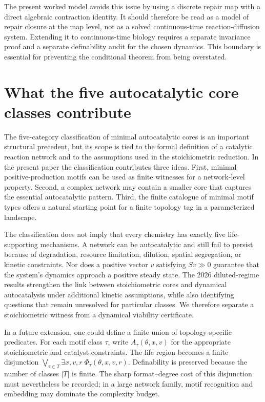 \documentclass[11pt,a4paper]{article}
\theoremstyle{definition}
\theoremstyle{remark}
\begin{document}
The present worked model avoids this issue by using a discrete repair map with a direct algebraic contraction identity. It should therefore be read as a model of repair closure at the map level, not as a solved continuous-time reaction-diffusion system. Extending it to continuous-time biology requires a separate invariance proof and a separate definability audit for the chosen dynamics. This boundary is essential for preventing the conditional theorem from being overstated.

\section{What the five autocatalytic core classes contribute}
The five-category classification of minimal autocatalytic cores is an important structural precedent, but its scope is tied to the formal definition of a catalytic reaction network and to the assumptions used in the stoichiometric reduction. In the present paper the classification contributes three ideas. First, minimal positive-production motifs can be used as finite witnesses for a network-level property. Second, a complex network may contain a smaller core that captures the essential autocatalytic pattern. Third, the finite catalogue of minimal motif types offers a natural starting point for a finite topology tag in a parameterized landscape.

The classification does not imply that every chemistry has exactly five life-supporting mechanisms. A network can be autocatalytic and still fail to persist because of degradation, resource limitation, dilution, spatial segregation, or kinetic constraints. Nor does a positive vector \(v\) satisfying \(Sv\gg0\) guarantee that the system's dynamics approach a positive steady state. The 2026 diluted-regime results strengthen the link between stoichiometric cores and dynamical autocatalysis under additional kinetic assumptions, while also identifying questions that remain unresolved for particular classes. We therefore separate a stoichiometric witness from a dynamical viability certificate.

In a future extension, one could define a finite union of topology-specific predicates. For each motif class \(\tau\), write \(A_\tau(\theta,x,v)\) for the appropriate stoichiometric and catalyst constraints. The life region becomes a finite disjunction \(\bigvee_{\tau\in T} \exists x,v,r\;\Phi_\tau(\theta,x,v,r)\). Definability is preserved because the number of classes \(|T|\) is finite. The sharp format--degree cost of this disjunction must nevertheless be recorded; in a large network family, motif recognition and embedding may dominate the complexity budget.
\end{document}

